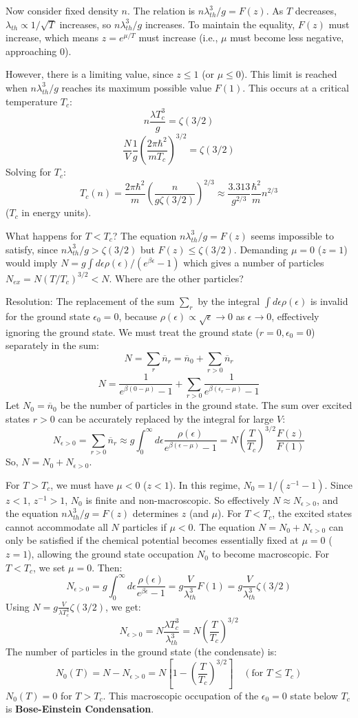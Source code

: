 \documentclass[11pt]{article}
\newcommand{\lambdaT}{\lambda_{th}} %
\newcommand{\eps}{\epsilon}
\newcommand{\nbar}{\overline{n}} %
\begin{document}
Now consider fixed density $n$. The relation is $n \lambdaT^3 / g = F(z)$.
As $T$ decreases, $\lambdaT \propto 1/\sqrt{T}$ increases, so $n\lambdaT^3/g$ increases. To maintain the equality, $F(z)$ must increase, which means $z=e^{\mu/T}$ must increase (i.e., $\mu$ must become less negative, approaching 0).

However, there is a limiting value, since $z \le 1$ (or $\mu \le 0$). This limit is reached when $n\lambdaT^3/g$ reaches its maximum possible value $F(1)$. This occurs at a critical temperature $T_c$:
\[ n \frac{\lambda T_c^3}{g} = \zeta(3/2) \]
\[ \frac{N}{V} \frac{1}{g} \left( \frac{2\pi\hbar^2}{m T_c} \right)^{3/2} = \zeta(3/2) \]
Solving for $T_c$:
\[ T_c(n) = \frac{2\pi\hbar^2}{m} \left( \frac{n}{g\zeta(3/2)} \right)^{2/3} \approx \frac{3.313}{g^{2/3}} \frac{\hbar^2}{m} n^{2/3} \]
($T_c$ in energy units).

What happens for $T < T_c$? The equation $n \lambdaT^3 / g = F(z)$ seems impossible to satisfy, since $n\lambdaT^3/g > \zeta(3/2)$ but $F(z) \le \zeta(3/2)$. Demanding $\mu=0$ ($z=1$) would imply $N = g \int d\eps \rho(\eps)/(e^{\beta\eps}-1)$ which gives a number of particles $N_{ex} = N (T/T_c)^{3/2} < N$. Where are the other particles?

Resolution: The replacement of the sum $\sum_r$ by the integral $\int d\eps \rho(\eps)$ is invalid for the ground state $\eps_0=0$, because $\rho(\eps) \propto \sqrt{\eps} \to 0$ as $\eps \to 0$, effectively ignoring the ground state.
We must treat the ground state ($r=0, \eps_0=0$) separately in the sum:
\[ N = \sum_r \nbar_r = \nbar_0 + \sum_{r>0} \nbar_r \]
\[ N = \frac{1}{e^{\beta(0-\mu)} - 1} + \sum_{r>0} \frac{1}{e^{\beta(\eps_r-\mu)} - 1} \]
Let $N_0 = \nbar_0$ be the number of particles in the ground state. The sum over excited states $r>0$ can be accurately replaced by the integral for large $V$:
\[ N_{\eps>0} = \sum_{r>0} \nbar_r \approx g \int_0^\infty d\eps \frac{\rho(\eps)}{e^{\beta(\eps-\mu)} - 1} = N \left(\frac{T}{T_c}\right)^{3/2} \frac{F(z)}{F(1)} \]
So, $N = N_0 + N_{\eps>0}$.

For $T > T_c$, we must have $\mu < 0$ ($z<1$). In this regime, $N_0 = 1/(z^{-1}-1)$. Since $z<1$, $z^{-1}>1$, $N_0$ is finite and non-macroscopic. So effectively $N \approx N_{\eps>0}$, and the equation $n \lambdaT^3 / g = F(z)$ determines $z$ (and $\mu$).
For $T < T_c$, the excited states cannot accommodate all $N$ particles if $\mu<0$. The equation $N = N_0 + N_{\eps>0}$ can only be satisfied if the chemical potential becomes essentially fixed at $\mu = 0$ ($z=1$), allowing the ground state occupation $N_0$ to become macroscopic.
For $T < T_c$, we set $\mu=0$. Then:
\[ N_{\eps>0} = g \int_0^\infty d\eps \frac{\rho(\eps)}{e^{\beta\eps} - 1} = g \frac{V}{\lambdaT^3} F(1) = g \frac{V}{\lambdaT^3} \zeta(3/2) \]
Using $N = g \frac{V}{\lambda T_c^3} \zeta(3/2)$, we get:
\[ N_{\eps>0} = N \frac{\lambda T_c^3}{\lambdaT^3} = N \left( \frac{T}{T_c} \right)^{3/2} \]
The number of particles in the ground state (the condensate) is:
\[ N_0(T) = N - N_{\eps>0} = N \left[ 1 - \left(\frac{T}{T_c}\right)^{3/2} \right] \quad (\text{for } T \le T_c) \]
$N_0(T)=0$ for $T>T_c$. This macroscopic occupation of the $\eps_0=0$ state below $T_c$ is \textbf{Bose-Einstein Condensation}.
\end{document}
